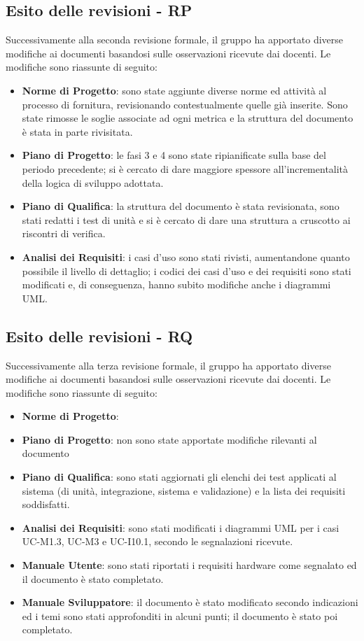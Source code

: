 \subsection{Esito delle revisioni - RP}	
Successivamente alla seconda revisione formale, il gruppo ha apportato diverse modifiche ai documenti basandosi sulle osservazioni ricevute dai docenti. Le modifiche sono riassunte di seguito:
	\begin{itemize}
		\item \textbf{Norme di Progetto}: sono state aggiunte diverse norme ed attività al processo di fornitura, revisionando contestualmente quelle già inserite. Sono state rimosse le soglie associate ad ogni metrica e la struttura del documento è stata in parte rivisitata.
		\item \textbf{Piano di Progetto}: le fasi 3 e 4 sono state ripianificate sulla base del periodo precedente; si è cercato di dare maggiore spessore all'incrementalità della logica di sviluppo adottata. 
		\item \textbf{Piano di Qualifica}: la struttura del documento è stata revisionata, sono stati redatti i test di unità e si è cercato di dare una struttura a cruscotto ai riscontri di verifica.
		\item \textbf{Analisi dei Requisiti}: i casi d'uso sono stati rivisti, aumentandone quanto possibile il livello di dettaglio; i codici dei casi d'uso e dei requisiti sono stati modificati e, di conseguenza, hanno subito modifiche anche i diagrammi UML.
	\end{itemize}

\subsection{Esito delle revisioni - RQ}	
Successivamente alla terza revisione formale, il gruppo ha apportato diverse modifiche ai documenti basandosi sulle osservazioni ricevute dai docenti. Le modifiche sono riassunte di seguito:
	\begin{itemize}
		\item \textbf{Norme di Progetto}: 
		\item \textbf{Piano di Progetto}: non sono state apportate modifiche rilevanti al documento
		\item \textbf{Piano di Qualifica}: sono stati aggiornati gli elenchi dei test applicati al sistema (di unità, integrazione, sistema e validazione) e la lista dei requisiti soddisfatti. 
		\item \textbf{Analisi dei Requisiti}: sono stati modificati i diagrammi UML per i casi UC-M1.3, UC-M3 e UC-I10.1, secondo le segnalazioni ricevute.
		\item \textbf{Manuale Utente}: sono stati riportati i requisiti hardware come segnalato ed il documento è stato completato.
		\item \textbf{Manuale Sviluppatore}: il documento è stato modificato secondo indicazioni ed i temi sono stati approfonditi in alcuni punti; il documento è stato poi completato.
	\end{itemize}
\newpage
